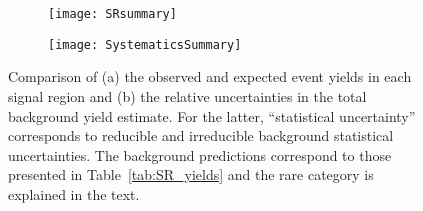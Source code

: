 \begin{figure}[t]
\begin{center}
\begin{subfigure}[t]{0.98\textwidth}\texttt{[image: SRsummary]}\caption{}\label{fig:Results_SRSum}\end{subfigure}
\begin{subfigure}[t]{1.08\textwidth}\texttt{[image: SystematicsSummary]}\caption{}\label{fig:Results_SystSum}\end{subfigure}
\end{center}
\caption{Comparison of (a) the observed and expected event yields in each signal region and (b) the relative uncertainties in the total 
background yield estimate. For the latter, ``statistical uncertainty'' corresponds to reducible and irreducible background 
statistical uncertainties. The background predictions correspond to those presented in Table~\ref{tab:SR_yields} and the 
rare category is explained in the text. } 
\label{fig:PlotSR}
\end{figure}


